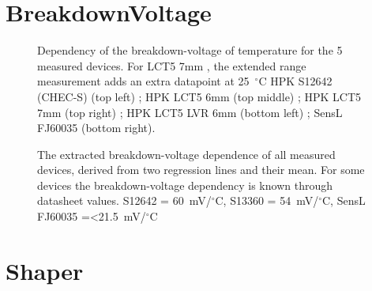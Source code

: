 \documentclass[12pt,article,type=msc,colorback,accentcolor=tud9c]{tudthesis}
\begin{document}
\clearpage
\section{BreakdownVoltage}
\label{appsec:Device_Vbr}
\begin{figure}[h]
\begin{centering}
\caption[Breakdown-voltage versus temperature]{Dependency of the breakdown-voltage of temperature for the 5 measured devices. For LCT5 7mm , the extended range measurement adds an extra datapoint at 25~$^\circ$C HPK S12642 (CHEC-S) (top left) ; HPK LCT5 6mm (top middle) ; HPK LCT5 7mm (top right) ; HPK LCT5 LVR 6mm (bottom left) ; SensL FJ60035 (bottom right).}
\label{app:Device_Vbr}
\end{centering}
\end{figure}

\begin{figure}[h]
\begin{centering}
\caption[Breakdown-voltage dependency]{The extracted breakdown-voltage dependence of all measured devices, derived from two regression lines and their mean. For some devices the breakdown-voltage dependency is known through datasheet values. S12642 = 60~mV/$^\circ$C, S13360 = 54~mV/$^\circ$C, SensL FJ60035 =<21.5~mV/$^\circ$C }
\label{app:Device_Vbr_Table}
\end{centering}
\end{figure}


\clearpage
\section{Shaper}
\label{appsec:shaper}
\end{document}
